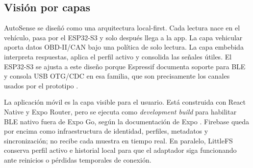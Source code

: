 \documentclass[12pt,letterpaper]{report}
\begin{document}
\subsection{Visión por capas}

AutoSense se diseñó como una arquitectura local-first. Cada lectura nace en el vehículo, pasa por el ESP32-S3 y solo después llega a la app. La capa vehicular aporta datos OBD-II/CAN bajo una política de solo lectura. La capa embebida interpreta respuestas, aplica el perfil activo y consolida las señales útiles. El ESP32-S3 se ajusta a este diseño porque Espressif documenta soporte para BLE y consola USB OTG/CDC en esa familia, que son precisamente los canales usados por el prototipo \cite{espressif2026_esp32s3_get_started,espressif2026_esp32s3_usb_otg_console,espressif2026_esp32s3_ble_overview}.

La aplicación móvil es la capa visible para el usuario. Está construida con React Native y Expo Router, pero se ejecuta como \emph{development build} para habilitar BLE nativo fuera de Expo Go, según la documentación de Expo \cite{expo2026_sdk_support,expo2026_development_build}. Firebase queda por encima como infraestructura de identidad, perfiles, metadatos y sincronización; no recibe cada muestra en tiempo real. En paralelo, LittleFS conserva perfil activo e historial local para que el adaptador siga funcionando ante reinicios o pérdidas temporales de conexión.
\end{document}
